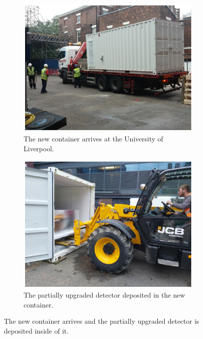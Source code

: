 \begin{figure}[htbp]
\centering
\begin{subfigure}{.5\textwidth}
  \centering
  \includegraphics[width=\linewidth]{Chapter3/Figs/Raster/detCon037c_ContainerArrives.png}
  \captionsetup{width=.9\linewidth}
  \caption{The new container arrives at the University of Liverpool.}
  \label{subFig:detCon037c_ContainerArrives}
\end{subfigure}%
\begin{subfigure}{.5\textwidth}
  \centering
  \includegraphics[width=\linewidth]{Chapter3/Figs/Raster/detCon039b_PutIn2.png}
  \captionsetup{width=.9\linewidth}
  \caption{The partially upgraded detector deposited in the new container.}
  \label{subFig:detCon039b_PutIn2}
\end{subfigure}
\caption{The new container arrives and the partially upgraded detector is deposited inside of it.}
\label{fig:detCon_ContainerArrives_PutIn}
\end{figure}

